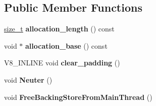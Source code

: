 \subsection*{Public Member Functions}
\begin{DoxyCompactItemize}
\item 
\mbox{\label{classv8_1_1internal_1_1JSArrayBuffer_a8e6c63f3717c65d389e42505a870d101}} 
\mbox{\hyperlink{classsize__t}{size\+\_\+t}} {\bfseries allocation\+\_\+length} () const
\item 
\mbox{\label{classv8_1_1internal_1_1JSArrayBuffer_a8e1336b76d19405ad54434de5a11c4d5}} 
void $\ast$ {\bfseries allocation\+\_\+base} () const
\item 
\mbox{\label{classv8_1_1internal_1_1JSArrayBuffer_a947dcf8e5b9cb2273d7330e8ba9746e7}} 
V8\+\_\+\+I\+N\+L\+I\+NE void {\bfseries clear\+\_\+padding} ()
\item 
\mbox{\label{classv8_1_1internal_1_1JSArrayBuffer_ab8aa5ae4495b3caf14dad14329d40fe6}} 
void {\bfseries Neuter} ()
\item 
\mbox{\label{classv8_1_1internal_1_1JSArrayBuffer_a52b461ddc2412fef45d5e8ab0d079a0c}} 
void {\bfseries Free\+Backing\+Store\+From\+Main\+Thread} ()
\end{DoxyCompactItemize}
